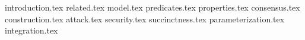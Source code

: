{introduction.tex}
{related.tex}
{model.tex}
{predicates.tex}
{properties.tex}
{consensus.tex}
{construction.tex}
{attack.tex}
{security.tex}
{succinctness.tex}
{parameterization.tex}
{integration.tex}

